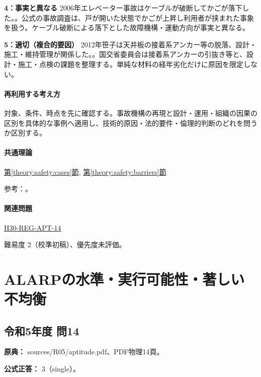 \noindent\textbf{4：事実と異なる} 2006年エレベーター事故はケーブルが破断してかごが落下した。。公式の事故調査は、戸が開いた状態でかごが上昇し利用者が挟まれた事象を扱う。ケーブル破断による落下とした故障機構・運動方向が事実と異なる。\par

\noindent\textbf{5：適切（複合的要因）} 2012年笹子は天井板の接着系アンカー等の脱落、設計・施工・維持管理が関係した。。国交省委員会は接着系アンカーの引抜き等と、設計・施工・点検の課題を整理する。単純な材料の経年劣化だけに原因を限定しない。\par

\paragraph{再利用する考え方} 対象、条件、時点を先に確認する。事故機構の再現と設計・運用・組織の因果の区別を具体的な事例へ適用し、技術的原因・法的要件・倫理的判断のどれを問うか区別する。

\paragraph{共通理論} \hyperref[theory:safety:cases]{第\ref*{theory:safety:cases}節}, \hyperref[theory:safety:barriers]{第\ref*{theory:safety:barriers}節}

\par 参考：\cite{mhlw_milk2002,milk_incident_company,muroran_ethics_cases,jtsb_fukuchiyama2007,caa_elevator2006,mlit_sasago2013}。

\paragraph{関連問題} \hyperref[q:h30-reg-apt-14]{H30-REG-APT-14}

\par 難易度 2（校準初稿）、優先度未評価。

\section{ALARPの水準・実行可能性・著しい不均衡}

\subsection{令和5年度 問14}
\label{q:r05-reg-apt-14}

\noindent\textbf{原典：} sources/R05/aptitude.pdf、PDF物理14頁。

\textbf{公式正答：} 3（single）。

